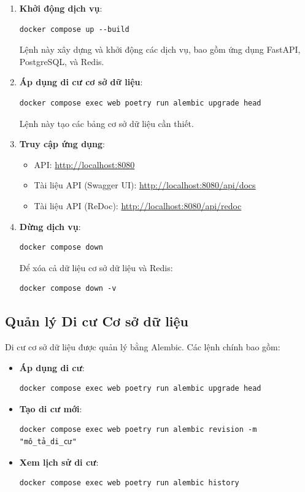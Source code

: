 \begin{enumerate}
    \item \textbf{Khởi động dịch vụ}:
    \begin{verbatim}
docker compose up --build
    \end{verbatim}
    Lệnh này xây dựng và khởi động các dịch vụ, bao gồm ứng dụng FastAPI, PostgreSQL, và Redis.

    \item \textbf{Áp dụng di cư cơ sở dữ liệu}:
    \begin{verbatim}
docker compose exec web poetry run alembic upgrade head
    \end{verbatim}
    Lệnh này tạo các bảng cơ sở dữ liệu cần thiết.

    \item \textbf{Truy cập ứng dụng}:
    \begin{itemize}
        \item API: \href{http://localhost:8080}{http://localhost:8080}
        \item Tài liệu API (Swagger UI): \href{http://localhost:8080/api/docs}{http://localhost:8080/api/docs}
        \item Tài liệu API (ReDoc): \href{http://localhost:8080/api/redoc}{http://localhost:8080/api/redoc}
    \end{itemize}

    \item \textbf{Dừng dịch vụ}:
    \begin{verbatim}
docker compose down
    \end{verbatim}
    Để xóa cả dữ liệu cơ sở dữ liệu và Redis:
    \begin{verbatim}
docker compose down -v
    \end{verbatim}
\end{enumerate}

\subsection*{Quản lý Di cư Cơ sở dữ liệu}

Di cư cơ sở dữ liệu được quản lý bằng Alembic. Các lệnh chính bao gồm:

\begin{itemize}
    \item \textbf{Áp dụng di cư}:
    \begin{verbatim}
docker compose exec web poetry run alembic upgrade head
    \end{verbatim}
    \item \textbf{Tạo di cư mới}:
    \begin{verbatim}
docker compose exec web poetry run alembic revision -m "mô_tả_di_cư"
    \end{verbatim}
    \item \textbf{Xem lịch sử di cư}:
    \begin{verbatim}
docker compose exec web poetry run alembic history
    \end{verbatim}
\end{itemize}


